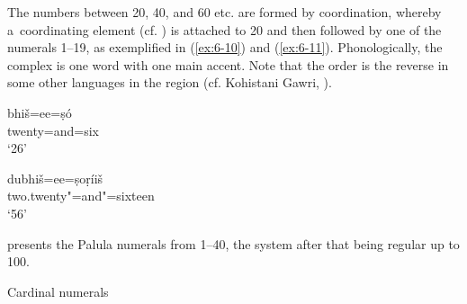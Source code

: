 {The numbers between 20, 40, and 60 etc. are formed by coordination, whereby a~coordinating element (cf. ) is attached to 20 and then followed by one of the numerals 1--19, as exemplified in (\ref{ex:6-10}) and (\ref{ex:6-11}). Phonologically, the complex is one word with one main accent. Note that the order is the reverse in some other languages in the region (cf. Kohistani Gawri, \citealt[57]{baart1999a}).

\begin{exe}
\ex
\label{ex:6-10}
\gll bhiš=ee=ṣó \\
twenty=and=six \\
\glt `26'

\ex
\label{ex:6-11}
\gll dubhiš=ee=ṣoṛíiš \\
two.twenty"=and"=sixteen \\
\glt `56'
\end{exe}

 presents the Palula numerals from 1--40, the system after that being regular up to 100.


\begin{table}[ht]
\caption{Cardinal numerals}




\end{table}}
